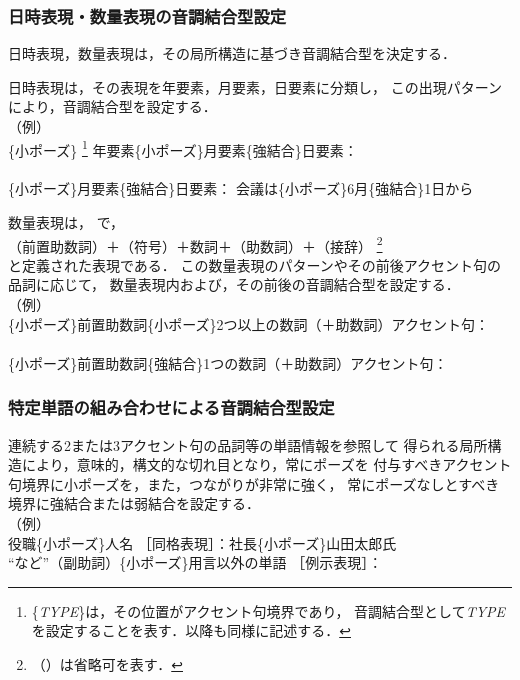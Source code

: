 \subsubsection{日時表現・数量表現の音調結合型設定} \label{subsub:num}
日時表現，数量表現は，その局所構造に基づき音調結合型を決定する．

日時表現は，その表現を年要素，月要素，日要素に分類し，
この出現パターンにより，音調結合型を設定する．\\
（例）\\
\{小ポーズ\}
\footnote{\{{\it TYPE}\}は，その位置がアクセント句境界であり，
音調結合型として{\it TYPE}を設定することを表す．以降も同様に記述する．}
年要素\{小ポーズ\}月要素\{強結合\}日要素：\\
\\
\{小ポーズ\}月要素\{強結合\}日要素：
{\dg 会議は\{小ポーズ\}6月\{強結合\}1日から}

数量表現は，
\cite{Miyazaki4}で，\\
（前置助数詞）＋（符号）＋数詞＋（助数詞）＋（接辞）
\footnote{（）は省略可を表す．}\\
と定義された表現である．
この数量表現のパターンやその前後アクセント句の品詞に応じて，
数量表現内および，その前後の音調結合型を設定する．\\
（例）\\
\{小ポーズ\}前置助数詞\{小ポーズ\}2つ以上の数詞（＋助数詞）アクセント句：\\
\\
\{小ポーズ\}前置助数詞\{強結合\}1つの数詞（＋助数詞）アクセント句：\\

\subsubsection{特定単語の組み合わせによる音調結合型設定}\label{subsub:combi}
連続する2または3アクセント句の品詞等の単語情報を参照して
得られる局所構造により，意味的，構文的な切れ目となり，常にポーズを
付与すべきアクセント句境界に小ポーズを，また，つながりが非常に強く，
常にポーズなしとすべき境界に強結合または弱結合を設定する．\\
（例）\\
役職\{小ポーズ\}人名 ［同格表現］：{\dg 社長\{小ポーズ\}山田太郎氏}\\
``など''（副助詞）\{小ポーズ\}用言以外の単語 ［例示表現］：\\


